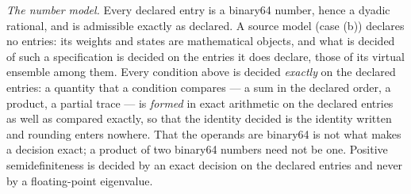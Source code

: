 \begin{definition}
\emph{The number model.} Every declared entry is a binary64 number, hence a
dyadic rational, and is admissible exactly as declared. A source model
(case (b)) declares no entries: its weights and states are mathematical
objects, and what is decided of such a specification is decided on the
entries it does declare, those of its virtual ensemble among them. Every
condition above is decided \emph{exactly} on the declared entries: a
quantity that a condition compares --- a sum in the declared order, a
product, a partial
trace --- is \emph{formed} in exact arithmetic on the declared entries as
well as compared exactly, so that the identity decided is the identity
written and rounding enters nowhere. That the operands are binary64 is not
what makes a decision exact; a product of two binary64 numbers need not be
one. Positive semidefiniteness is decided by an exact decision on the
declared entries and never by a floating-point eigenvalue.
\end{definition}

